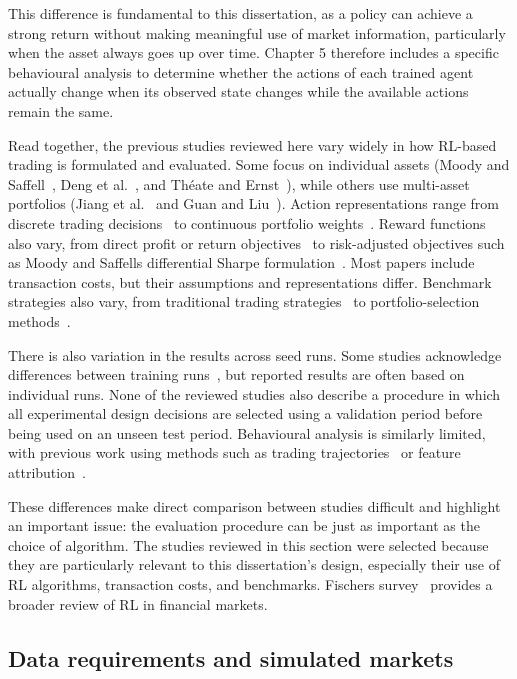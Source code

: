 This difference is fundamental to this dissertation, as a policy can
achieve a strong return without making meaningful use of market
information, particularly when the asset always goes up over time.
Chapter 5 therefore includes a specific behavioural analysis to
determine whether the actions of each trained agent actually change when
its observed state changes while the available actions remain the same.

Read together, the previous studies reviewed here vary widely in how
RL-based trading is formulated and evaluated. Some focus on individual
assets (Moody and Saffell~\cite{moody2001}, Deng et al.~\cite{deng2017}, and Théate and
Ernst~\cite{theate2021}), while others use multi-asset portfolios (Jiang et al.~\cite{jiang2017} and Guan and Liu~\cite{guan2021xrl}). Action representations range from
discrete trading decisions~\cite{moody2001, deng2017, theate2021} to continuous portfolio
weights~\cite{jiang2017}. Reward functions also vary, from direct profit or
return objectives~\cite{deng2017, jiang2017, theate2021} to risk-adjusted objectives such as
Moody and Saffell\textquotesingle s differential Sharpe formulation~\cite{moody2001}. Most papers include transaction costs, but their assumptions
and representations differ. Benchmark strategies also vary, from
traditional trading strategies~\cite{theate2021} to portfolio-selection methods~\cite{jiang2017}.

There is also variation in the results across seed runs. Some studies
acknowledge differences between training runs~\cite{theate2021}, but reported
results are often based on individual runs. None of the reviewed studies
also describe a procedure in which all experimental design decisions are
selected using a validation period before being used on an unseen test
period. Behavioural analysis is similarly limited, with previous work
using methods such as trading trajectories~\cite{theate2021} or feature
attribution~\cite{guan2021xrl}.

These differences make direct comparison between studies difficult and
highlight an important issue: the evaluation procedure can be just as
important as the choice of algorithm. The studies reviewed in this
section were selected because they are particularly relevant to this
dissertation's design, especially their use of RL algorithms,
transaction costs, and benchmarks. Fischer\textquotesingle s survey~\cite{fischer2018} provides a broader review of RL in financial markets.

\subsection{Data requirements and simulated markets}

